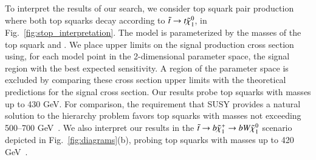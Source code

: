 

To interpret the results of our search, we consider top squark pair production where both top squarks decay according to 
$\tilde{t}\to t\tilde{\chi}_{1}^{0}$, in Fig.~\ref{fig:stop_interpretation}.
The model is parameterized by the masses of the top squark and \lsp. We place upper limits on the signal
production cross section using, for each model point in the 2-dimensional parameter space, the signal region with the best expected
sensitivity. A region of the parameter space is excluded by comparing these cross section upper limits with the theoretical predictions 
for the signal cross section.
Our results probe top squarks with masses up to 430 GeV. For comparison, the requirement that SUSY
provides a natural solution to the hierarchy problem favors top squarks with masses not exceeding 500--700 GeV~\cite{ref:naturalsusy}.
We also interpret our results in the $\tilde{t}\to b\tilde{\chi}_{1}^{+}\to b W \tilde{\chi}_{1}^{0}$ scenario
depicted in Fig.~\ref{fig:diagrams}(b), probing top squarks with masses up to 420 GeV~\cite{ref:stop}.


